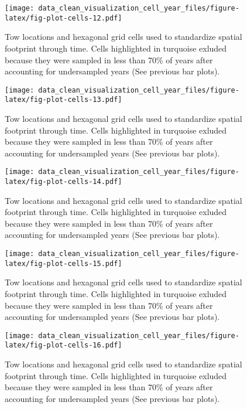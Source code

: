 \documentclass[
]{article}
\begin{document}
\begin{figure}
\centering
\texttt{[image: data\_clean\_visualization\_cell\_year\_files/figure-latex/fig-plot-cells-12.pdf]}
\caption{\label{fig:fig-plot-cells-12}Tow locations and hexagonal grid cells used to standardize spatial footprint through time. Cells highlighted in turquoise exluded because they were sampled in less than 70\% of years after accounting for undersampled years (See previous bar plots).}
\end{figure}

\begin{figure}
\centering
\texttt{[image: data\_clean\_visualization\_cell\_year\_files/figure-latex/fig-plot-cells-13.pdf]}
\caption{\label{fig:fig-plot-cells-13}Tow locations and hexagonal grid cells used to standardize spatial footprint through time. Cells highlighted in turquoise exluded because they were sampled in less than 70\% of years after accounting for undersampled years (See previous bar plots).}
\end{figure}

\begin{figure}
\centering
\texttt{[image: data\_clean\_visualization\_cell\_year\_files/figure-latex/fig-plot-cells-14.pdf]}
\caption{\label{fig:fig-plot-cells-14}Tow locations and hexagonal grid cells used to standardize spatial footprint through time. Cells highlighted in turquoise exluded because they were sampled in less than 70\% of years after accounting for undersampled years (See previous bar plots).}
\end{figure}

\begin{figure}
\centering
\texttt{[image: data\_clean\_visualization\_cell\_year\_files/figure-latex/fig-plot-cells-15.pdf]}
\caption{\label{fig:fig-plot-cells-15}Tow locations and hexagonal grid cells used to standardize spatial footprint through time. Cells highlighted in turquoise exluded because they were sampled in less than 70\% of years after accounting for undersampled years (See previous bar plots).}
\end{figure}

\begin{figure}
\centering
\texttt{[image: data\_clean\_visualization\_cell\_year\_files/figure-latex/fig-plot-cells-16.pdf]}
\caption{\label{fig:fig-plot-cells-16}Tow locations and hexagonal grid cells used to standardize spatial footprint through time. Cells highlighted in turquoise exluded because they were sampled in less than 70\% of years after accounting for undersampled years (See previous bar plots).}
\end{figure}
\end{document}
